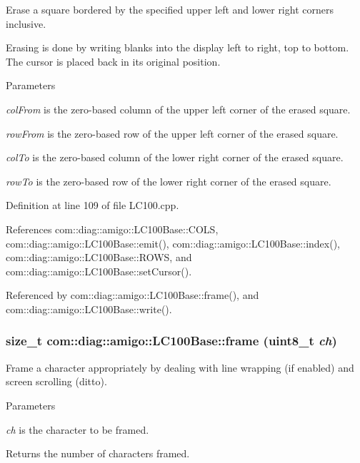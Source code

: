 Erase a square bordered by the specified upper left and lower right corners inclusive. 

Erasing is done by writing blanks into the display left to right, top to bottom. The cursor is placed back in its original position. 
\begin{DoxyParams}{Parameters}
\item[{\em colFrom}]is the zero-\/based column of the upper left corner of the erased square. \item[{\em rowFrom}]is the zero-\/based row of the upper left corner of the erased square. \item[{\em colTo}]is the zero-\/based column of the lower right corner of the erased square. \item[{\em rowTo}]is the zero-\/based row of the lower right corner of the erased square. \end{DoxyParams}


Definition at line 109 of file LC100.cpp.



References com::diag::amigo::LC100Base::COLS, com::diag::amigo::LC100Base::emit(), com::diag::amigo::LC100Base::index(), com::diag::amigo::LC100Base::ROWS, and com::diag::amigo::LC100Base::setCursor().



Referenced by com::diag::amigo::LC100Base::frame(), and com::diag::amigo::LC100Base::write().

\hypertarget{classcom_1_1diag_1_1amigo_1_1LC100Base_ae97773781b9decc7a4f6f08eb6ec5162}{
\subsubsection[{frame}]{\setlength{\rightskip}{0pt plus 5cm}size\_\-t com::diag::amigo::LC100Base::frame (uint8\_\-t {\em ch})}}
\label{classcom_1_1diag_1_1amigo_1_1LC100Base_ae97773781b9decc7a4f6f08eb6ec5162}


Frame a character appropriately by dealing with line wrapping (if enabled) and screen scrolling (ditto). 


\begin{DoxyParams}{Parameters}
\item[{\em ch}]is the character to be framed. \end{DoxyParams}
\begin{DoxyReturn}{Returns}
the number of characters framed. 
\end{DoxyReturn}


